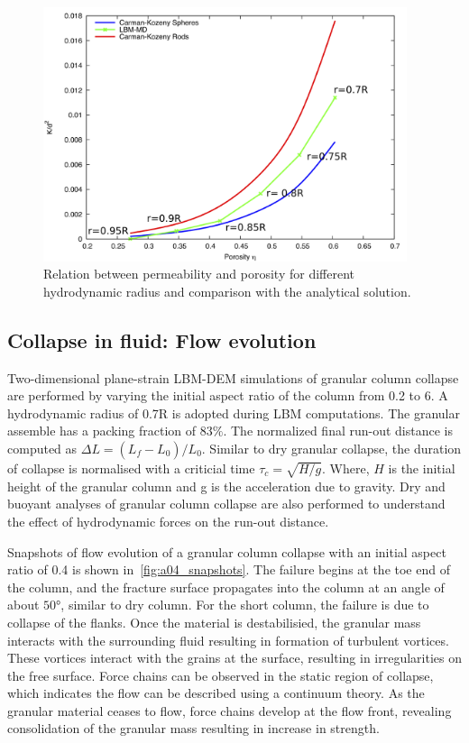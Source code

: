 \begin{figure}[htpb]
\centering
\includegraphics[width=0.95\textwidth]{Carman}
\caption{Relation between permeability and porosity for 
different hydrodynamic radius and comparison with the analytical solution.}
\label{fig:Carman}
\end{figure}

\subsection{Collapse in fluid: Flow evolution}
Two-dimensional plane-strain LBM-DEM simulations of granular column 
collapse are performed by varying the initial aspect ratio of the column from 
0.2 to 6. A hydrodynamic radius of 0.7R is adopted during LBM computations.  
The granular assemble has a packing fraction of $83\%$. The normalized final 
run-out distance is computed as $\Delta L = 
(L_{\textit{f}}-L_{\textit{0}})/L_{\textit{0}}$. Similar to dry granular 
collapse, the duration of collapse is normalised with a criticial time $\tau_c 
= \sqrt{H/g}$. Where, $H$ is the initial height of the granular column and g is 
the acceleration due to gravity.  Dry and buoyant analyses of granular column 
collapse are also performed to understand the effect of hydrodynamic forces on 
the run-out distance.

Snapshots of flow evolution of a granular column collapse with an initial 
aspect ratio of 0.4 is shown in~\cref{fig:a04_snapshots}. The failure begins at 
the toe end of the column, and the fracture surface propagates into the column 
at an angle of about $50\si{\degree}$, similar to dry column. For the short 
column, the failure is due to collapse of the flanks. Once the material is 
destabilisied, the granular mass interacts with the surrounding fluid resulting 
in formation of turbulent vortices. These vortices interact with the grains at 
the surface, resulting in irregularities on the free surface. Force chains can 
be observed in the static region of collapse, which indicates the flow can be 
described using a continuum theory. As the granular material ceases to flow, 
force chains develop at the flow front, revealing consolidation of the granular 
mass resulting in increase in strength. 

